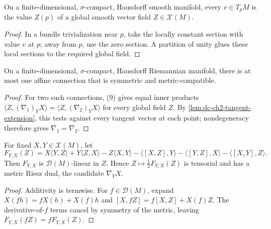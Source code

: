 \begin{lemma}
  \label{lem:dc-ch2-tangent-extension}


  On a finite-dimensional, $\sigma$-compact, Hausdorff smooth manifold, every
  $v\in T_pM$ is the value $Z(p)$ of a global smooth vector field
  $Z\in\mathcal{X}(M)$.
\end{lemma}
\begin{proof}

  \sketch
  In a bundle trivialization near $p$, take the locally constant section with
  value $v$ at $p$; away from $p$, use the zero section. A partition of unity
  glues these local sections to the required global field.
\end{proof}

\begin{lemma}
  \label{lem:dc-ch2-3-6-unique}


  On a finite-dimensional, $\sigma$-compact, Hausdorff Riemannian manifold,
  there is at most one affine connection that is symmetric and
  metric-compatible.
\end{lemma}
\begin{proof}

  \sketch
  For two such connections, (9) gives equal inner products
  $\langle Z,(\nabla_1)_YX\rangle=\langle Z,(\nabla_2)_YX\rangle$ for every
  global field $Z$. By \cref{lem:dc-ch2-tangent-extension}, this tests against
  every tangent vector at each point; nondegeneracy therefore gives
  $\nabla_1=\nabla_2$.
\end{proof}

\begin{lemma}
  \label{lem:dc-ch2-3-6-welldef}


  For fixed $X,Y\in\mathcal{X}(M)$, let
  \[
    F_{Y,X}(Z)
      =X\langle Y,Z\rangle+Y\langle Z,X\rangle-Z\langle X,Y\rangle
       -\langle[X,Z],Y\rangle-\langle[Y,Z],X\rangle
       -\langle[X,Y],Z\rangle.
  \]
  Then $F_{Y,X}$ is $\mathcal{D}(M)$-linear in $Z$. Hence
  $Z\mapsto\frac12F_{Y,X}(Z)$ is tensorial and has a metric Riesz dual, the
  candidate $\nabla_YX$.
\end{lemma}
\begin{proof}

  \sketch
  Additivity is termwise. For $f\in\mathcal{D}(M)$, expand
  $X(fh)=fX(h)+X(f)h$ and
  $[X,fZ]=f[X,Z]+X(f)Z$. The derivative-of-$f$ terms cancel by symmetry of the
  metric, leaving $F_{Y,X}(fZ)=fF_{Y,X}(Z)$.
\end{proof}

